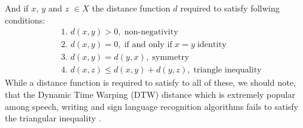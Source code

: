 And if $x$, $y$ and $z$ $\in X$ the distance function $d$ required to satisfy follwing conditions:
\begin{align}
 & \mbox{1. } d(x, y) > 0, \; \mbox{non-negativity} \\
 & \mbox{2. } d(x, y) = 0, \; \mbox{if and only if} \; x = y  \;  \mbox{identity} \\
 & \mbox{3. } d(x, y) = d(y, x), \; \mbox{symmetry} \\
 & \mbox{4. } d(x, z) \leq d(x, y) + d(y, z), \; \mbox{triangle inequality}
\end{align}
While a distance function is required to satisfy to all of these, we should note, that the Dynamic Time Warping (DTW) distance which is extremely popular among speech, writing and sign language recognition algorithms \cite{citeulike:3496861} \cite{citeulike:3744226} \cite{citeulike:3733947} \cite{citeulike:3789964} fails to satisfy the triangular inequality \cite{citeulike:4343286} \cite{citeulike:4343933}.